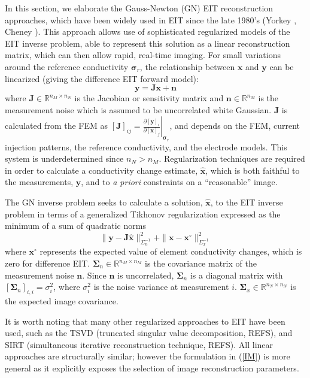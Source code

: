 \documentclass[12pt]{iopart}
\newcommand{\xB}{\mbox{$\mathbf{x}$}}
\newcommand{\xH}{\mbox{$\mathbf{\hat x}$}}
\newcommand{\nB}{\mbox{$\mathbf{n}$}}
\newcommand{\yB}{\mbox{$\mathbf{y}$}}
\newcommand{\JB}{\mbox{$\mathbf{J}$}}
\newcommand{\SG}{\mbox{${\boldsymbol \Sigma}$}}
\newcommand{\sG}{\mbox{${\boldsymbol \sigma}$}}
\begin{document}
In this section, we elaborate the
Gauss-Newton (GN) EIT reconstruction approaches,
which have been
widely used in EIT since the late 1980's (Yorkey ,
Cheney ).
This approach allows use of sophisticated regularized models
of the EIT inverse problem, able to represent this
solution as a linear reconstruction matrix, which can then allow
rapid, real-time imaging.
For small variations around the reference
conductivity $\sG_r$, the relationship between $\xB$ and $\yB$ can
be linearized (giving the difference EIT forward model):
\begin{equation}\label{FM}
\yB=\JB\xB+\nB
\end{equation}
where
$\JB\in\mathbb{R}^{n_M\times n_N}$ is the Jacobian or sensitivity
matrix and $\nB\in\mathbb{R}^{n_M}$ is the measurement noise which is
assumed to be uncorrelated white Gaussian. $\JB$ is calculated from
the FEM as
$[\JB]_{ij}=\left.
     \frac{\partial[\yB]_i}{\partial[\xB]_j}
          \right|_{\sG_r}$,
and depends on the FEM, current injection patterns, the reference
conductivity, and the electrode models. This system is
underdetermined since $n_N > n_M$. 
Regularization techniques are required
in order to calculate a conductivity change
estimate, $\xH$, which is both
faithful to the measurements, $\yB$, and to
{\em a priori} constraints on a ``reasonable'' image.

The GN inverse problem seeks to
calculate a solution, $\xH$, to the EIT inverse problem
in terms of a generalized Tikhonov regularization 
expressed as the minimum of a sum of quadratic norms
\begin{equation}\label{IM}
 \|\yB-\JB\xH\|_{\Sigma_n^{-1}}^2 +
 \|\xB-\xB^\circ\|_{\Sigma_x^{-1}}^2
\end{equation}
where $\xB^\circ$ represents the expected value of element
conductivity changes, which is zero for  difference EIT.
$\SG_n\in\mathbb{R}^{n_M\times n_M}$ is
 the covariance matrix of the measurement noise $\nB$. Since
$\nB$ is uncorrelated, $\SG_n$ is a diagonal matrix with
$[\SG_n]_{i,i}=\sigma_i^2$, where $\sigma_i^2$ is the noise variance at
measurement $i$. $\SG_x\in\mathbb{R}^{n_N\times
n_N}$ is the expected image covariance.

It is worth noting that many other regularized approaches
to EIT have been used, such as the
TSVD (truncated singular value decomposition, REFS),
and
SIRT (simultaneous iterative reconstruction technique, REFS).
All linear approaches are structurally similar; however
the formulation in (\ref{IM}) is more general
as it explicitly exposes the selection of image reconstruction
parameters.
\end{document}
